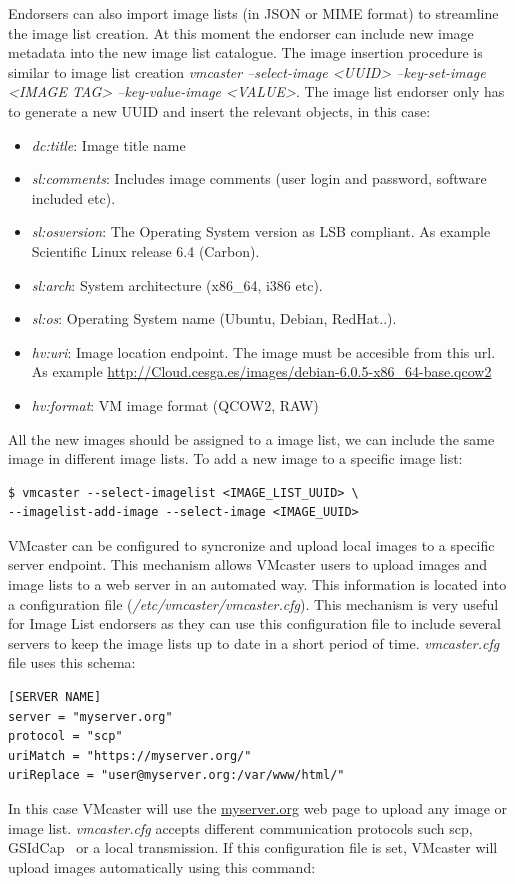 \documentclass{cai}
\begin{document}
Endorsers can also import image lists (in JSON or MIME format) to streamline the image list creation. At this moment the endorser can include new image metadata into the new image list catalogue.
The image insertion procedure is similar to image list creation \textit{vmcaster --select-image <UUID> --key-set-image <IMAGE TAG> --key-value-image <VALUE>}.  
The image list endorser only has to generate a new UUID and insert the relevant objects, in this case:
\begin{itemize}
 \item \textit{dc:title}: Image title name
 \item \textit{sl:comments}: Includes image comments (user login and password, software included etc).
 \item \textit{sl:osversion}: The Operating System version as LSB compliant. As example Scientific Linux release 6.4 (Carbon).
 \item \textit{sl:arch}: System architecture (x86\_64, i386 etc).
 \item \textit{sl:os}: Operating System name (Ubuntu, Debian, RedHat..).
 \item \textit{hv:uri}: Image location endpoint. The image must be accesible from this url. As example \url{http://Cloud.cesga.es/images/debian-6.0.5-x86_64-base.qcow2}
 \item \textit{hv:format}: VM image format (QCOW2, RAW)
\end{itemize}
All the new images should be assigned to a image list, we can include the same image in different image lists. To add a new image to a specific image list:

\begin{verbatim}
$ vmcaster --select-imagelist <IMAGE_LIST_UUID> \
--imagelist-add-image --select-image <IMAGE_UUID>
\end{verbatim}

VMcaster can be configured to syncronize and upload local images to a specific server endpoint. This mechanism allows VMcaster users to upload images and image lists to a web server in an automated way.
This information is located into a configuration file (\textit{/etc/vmcaster/vmcaster.cfg}). This mechanism is very useful for Image List endorsers as they can use this configuration file to include several servers to keep the image lists up to date in a short period of time.
\textit{vmcaster.cfg} file uses this schema:
\begin{verbatim}
[SERVER NAME]
server = "myserver.org"
protocol = "scp"
uriMatch = "https://myserver.org/"
uriReplace = "user@myserver.org:/var/www/html/"
\end{verbatim}
In this case VMcaster will use the \url{myserver.org} web page to upload any image or image list. 
\textit{vmcaster.cfg} accepts different communication protocols such scp, GSIdCap~\cite{dcache} or a local transmission. If this configuration file is set, VMcaster will upload images automatically using this command:
\end{document}
